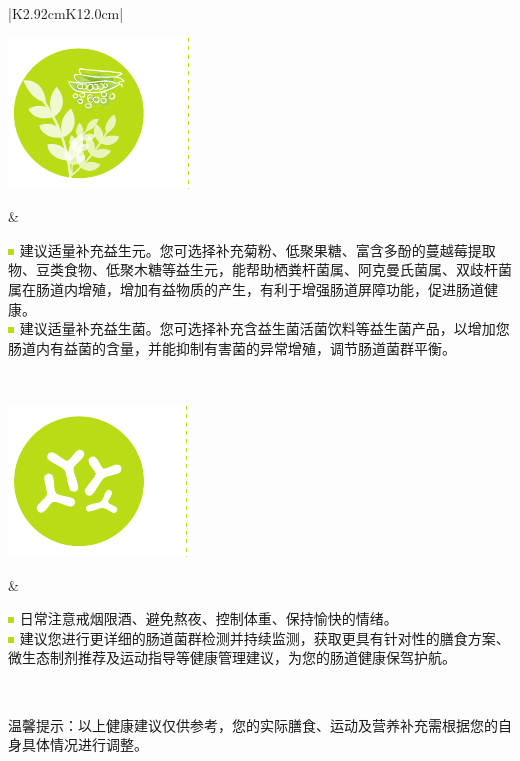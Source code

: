 \begin{center}
\begin{tabular}{|K{2.92cm}K{12.0cm}|}
\parbox[c][5.0cm]{.95\hsize}{
\noindent
\includegraphics[scale=1.0]{baohuliprebioticswithvline.pdf}
}
 &
\hspace*{4mm}
\parbox{.95\hsize}{
\vspace*{3mm}
\begin{spacing}{1.5}
\includegraphics[scale=1.0]{xiaofangkuai.pdf}
{\fontsize{8pt}{11pt}\selectfont 建议适量补充益生元。您可选择补充菊粉、低聚果糖、富含多酚的蔓越莓提取物、豆类食物、低聚木糖等益生元，能帮助栖粪杆菌属、阿克曼氏菌属、双歧杆菌属在肠道内增殖，增加有益物质的产生，有利于增强肠道屏障功能，促进肠道健康。}
\\
\includegraphics[scale=1.0]{xiaofangkuai.pdf}
{\fontsize{8pt}{11pt}\selectfont 建议适量补充益生菌。您可选择补充含益生菌活菌饮料等益生菌产品，以增加您肠道内有益菌的含量，并能抑制有害菌的异常增殖，调节肠道菌群平衡。}
\end{spacing}
} \\
\hline
\parbox[c][5.0cm]{.95\hsize}{
\noindent
\includegraphics[scale=1.0]{baohuliprobioticswithvline.pdf}
}
 &
\hspace*{4mm}
\parbox{.95\hsize}{
\vspace*{3mm}
\begin{spacing}{1.5}
\includegraphics[scale=1.0]{xiaofangkuai.pdf}
{\fontsize{8pt}{11pt}\selectfont 日常注意戒烟限酒、避免熬夜、控制体重、保持愉快的情绪。}
\\
\includegraphics[scale=1.0]{xiaofangkuai.pdf}
{\fontsize{8pt}{11pt}\selectfont 建议您进行更详细的肠道菌群检测并持续监测，获取更具有针对性的膳食方案、微生态制剂推荐及运动指导等健康管理建议，为您的肠道健康保驾护航。}
\end{spacing}
} \\
\hline
\end{tabular}
\end{center}

{\noindent\qihao *温馨提示：以上健康建议仅供参考，您的实际膳食、运动及营养补充需根据您的自身具体情况进行调整。}
\vspace*{1cm}


